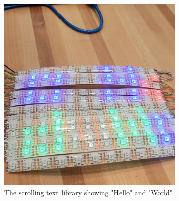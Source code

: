 \documentclass[onecolumn, draftclsnofoot,10pt, compsoc]{IEEEtran}
\begin{document}
\begin{figure}
\caption{The scrolling text library showing "Hello" and "World"}
\vspace{2mm}
\includegraphics[width=0.8\textwidth, natwidth=529,natheight=532]{./exPics/light.eps}
\end{figure}
\end{document}
